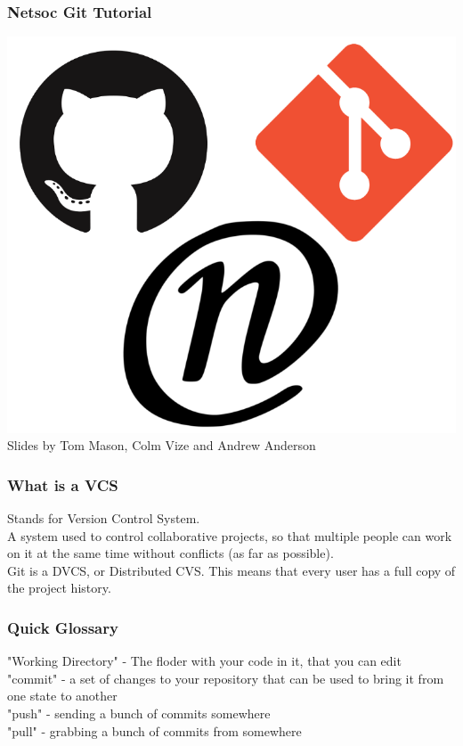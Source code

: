 \documentclass[xcolor=dvipsnames]{beamer}
\begin{document}
\begin{frame}
    \frametitle{Netsoc Git Tutorial}

    \begin{center}
        \includegraphics[scale=0.3]{nat.png}\\
        Slides by Tom Mason, Colm Vize and Andrew Anderson
    \end{center}
\end{frame}

\begin{frame}
    \frametitle{What is a VCS}
    
    Stands for Version Control System.\\
    A system used to control collaborative projects, so that multiple people can work on it at the same
    time without conflicts (as far as possible).\\
    Git is a DVCS, or Distributed CVS. This means that every user has a full copy of the project history.\\
\end{frame}

\begin{frame}
    \frametitle{Quick Glossary}
    "Working Directory" - The floder with your code in it, that you can edit\\
    "commit" - a set of changes to your repository that can be used to bring it from one state to another\\
    "push" - sending a bunch of commits somewhere\\
    "pull" - grabbing a bunch of commits from somewhere
\end{frame}
\end{document}
